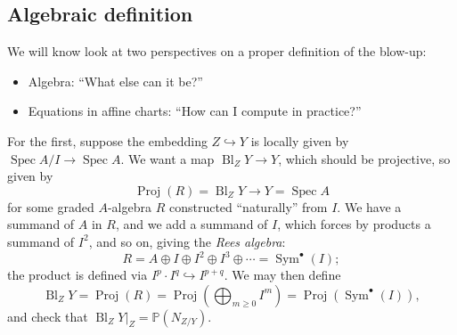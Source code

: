 \documentclass{article}
\theoremstyle{definition}
\DeclareMathOperator{\Spec}{Spec}
\DeclareMathOperator{\Proj}{Proj}
\DeclareMathOperator{\Sym}{Sym}
\DeclareMathOperator{\Bl}{Bl}
\renewcommand{\P}{\mathbb{P}}
\begin{document}
\subsection*{Algebraic definition}

We will know look at two perspectives on a proper definition of the blow-up:
\begin{itemize}
    \item Algebra: ``What else can it be?''
    \item Equations in affine charts: ``How can I compute in practice?''
\end{itemize}

For the first, suppose the embedding $Z\hookrightarrow Y$ is locally given by
$\Spec A/I\to\Spec A$. We want a map $\Bl_ZY\to Y$, which should be projective,
so given by
\begin{equation*}
    \Proj(R) = \Bl_ZY \to Y = \Spec A
\end{equation*}
for some graded $A$-algebra $R$ constructed ``naturally'' from $I$. We have a
summand of $A$ in $R$, and we add a summand of $I$, which forces by products a
summand of $I^2$, and so on, giving the \emph{Rees algebra}:
\begin{equation*}
    R = A\oplus I\oplus I^2\oplus I^3\oplus\cdots = \Sym^\bullet(I);
\end{equation*}
the product is defined via $I^p\cdot I^q\hookrightarrow I^{p+q}$. We may then
define
\begin{equation*}
    \Bl_ZY = \Proj(R) = \Proj(\bigoplus_{m\ge0}I^m) = \Proj(\Sym^\bullet(I)),
\end{equation*}
and check that $\Bl_ZY|_Z=\P(N_{Z/Y})$.
\end{document}
